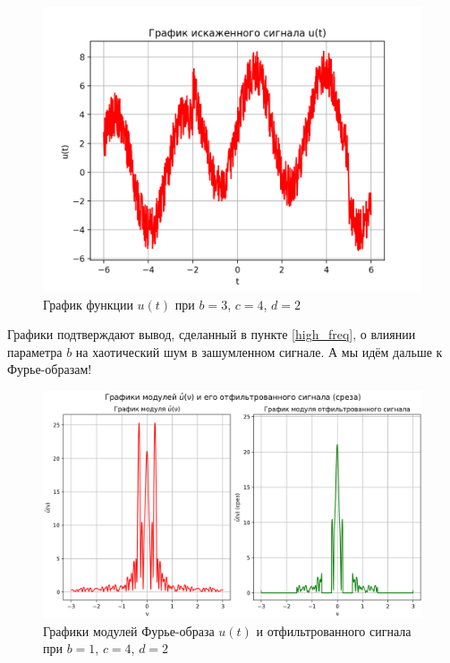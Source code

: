 \clearpage

\begin{figure}[ht!]
    \centering
    \includegraphics[scale=0.75]{media/1 task/specific_freq/Noisy_3_4_2.png}
    \caption{График функции $u(t)$ при $b=3$,  $c=4$,  $d=2$}
    \label{fig:noisy_3_4_2}
\end{figure}

Графики подтверждают вывод, сделанный в пункте \ref{high_freq}, о влиянии параметра $b$ на хаотический шум в зашумленном сигнале. А мы идём дальше к Фурье-образам!

\clearpage

\begin{figure}[ht!]
    \centering
    \includegraphics[scale=0.55]{media/1 task/specific_freq/Fourier_Image_1_4_2_-0,6_-0,22_-2,99_-1,6.png}
    \caption{Графики модулей Фурье-образа $u(t)$ и отфильтрованного сигнала при $b=1$,  $c=4$,  $d=2$}
    \label{fig:four_1_4_2}
\end{figure}



